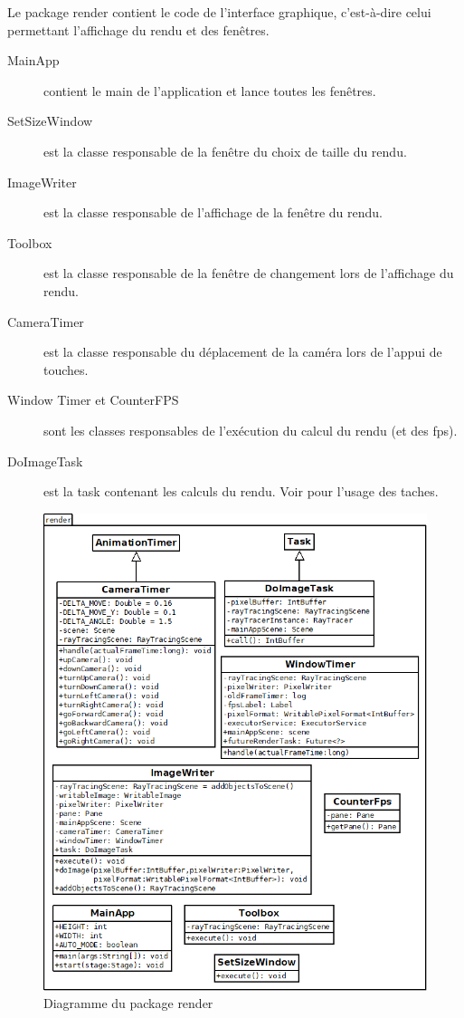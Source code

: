 Le package render contient le code de l'interface graphique, c'est-à-dire celui permettant l'affichage du rendu et des fenêtres.

\begin{description}
    \item [MainApp] contient le main de l'application et lance toutes les fenêtres.
    \item [SetSizeWindow] est la classe responsable de la fenêtre du choix de taille du rendu.
    \item [ImageWriter] est la classe responsable de l'affichage de la fenêtre du rendu.
    \item [Toolbox] est la classe responsable de la fenêtre de changement lors de l'affichage du rendu.
    \item [CameraTimer] est la classe responsable du déplacement de la caméra lors de l'appui de touches.
    \item [Window Timer et CounterFPS] sont les classes responsables de l'exécution du calcul du rendu (et des fps).
    \item [DoImageTask] est la task contenant les calculs du rendu. Voir  pour l'usage des taches.
\end{description}



\begin{figure}[h]
   \begin{center}
       \includegraphics[scale=0.5]{img/render.javafx/diagClassRender.png}
   \end{center}
   \caption{Diagramme du package render}
\end{figure}
